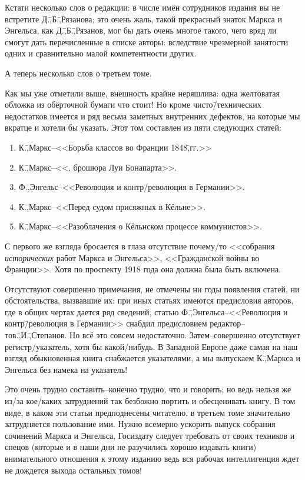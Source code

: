 Кстати несколько слов о редакции: в числе имён сотрудников издания вы не встретите Д.\=,Б.\=,Рязанова; это очень жаль, такой прекрасный знаток Маркса и Энгельса, как Д.\=,Б.\=,Рязанов, мог бы дать очень многое такого, чего вряд ли смогут дать перечисленные в списке авторы: вследствие чрезмерной занятости одних и сравнительно малой компетентности других.

А теперь несколько слов о третьем томе.

Как мы уже отметили выше, внешность крайне неряшлива: одна желтоватая обложка из обёрточной бумаги что стоит! Но кроме чисто\=/технических недостатков имеется и ряд весьма заметных внутренних дефектов, на которые мы вкратце и хотели бы указать. Этот том составлен из пяти следующих статей:
\begin{enumerate}
 \item К.\=,Маркс\---<<Борьба классов во Франции 1848\=,гг.>>
 \item К.\=,Маркс\---<<\grqq, брошюра Луи Бонапарта>>.
 \item Ф.\=,Энгельс\---<<Революция и контр\=/революция в Германии>>.
 \item К.\=,Маркс\---<<Перед судом присяжных в Кёльне>>.
 \item К.\=,Маркс\---<<Разоблачения о Кёльнском процессе коммунистов>>.
\end{enumerate}

С первого же взгляда бросается в глаза отсутствие почему\-/то <<собрания \emph{исторических} работ Маркса и Энгельса>>, <<Гражданской войны во Франции>>. Хотя по проспекту 1918 года она должна была быть включена.

Отсутствуют совершенно примечания, не отмечены ни годы появления статей, ни обстоятельства, вызвавшие их: при иных статьях имеются предисловия авторов, где в общих чертах дается ряд сведений, статью Ф.\=,Энгельса\---<<Революция и контр\=/революция в Германии>> снабдил предисловием редактор\---тов.\=,И.\=,Степанов. Но всё это совсем недостаточно. Затем\---совершенно отсутствует регистр\-/указатель, хотя бы какой\-/нибудь. В Западной Европе даже самая на наш взгляд обыкновенная книга снабжается указателями, а мы выпускаем К.\=,Маркса и Энгельса без намека на указатель!

Это очень трудно составить\---конечно трудно, что и говорить; но ведь нельзя же из\-/за кое\-/каких затруднений так безбожно портить и обесценивать книгу. В том виде, в каком эти статьи предподнесены читателю, в третьем томе значительно затрудняется пользование ими. Нужно всемерно ускорить выпуск собрания сочинений Маркса и Энгельса, Госиздату следует требовать от своих техников и спецов (которые и в наши дни не разучились хорошо издавать книги) внимательного отношения к этому изданию ведь вся рабочая интеллигенция ждет не дождется выхода остальных томов!

